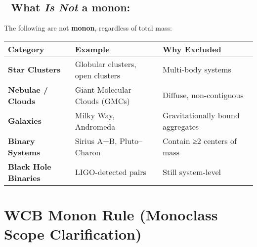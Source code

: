 \documentclass[
  letterpaper,
]{book}
\begin{document}
\subsection{\texorpdfstring{🚫 What \emph{Is Not} a
monon:}{🚫 What Is Not a monon:}}\label{what-is-not-a-monon}

The following are not \textbf{monon}, regardless of total mass:

\begin{longtable}[]{@{}
  >{\raggedright\arraybackslash}p{}
  >{\raggedright\arraybackslash}p{}
  >{\raggedright\arraybackslash}p{}@{}}
\toprule\noalign{}
\begin{minipage}[b]{\linewidth}\raggedright
Category
\end{minipage} & \begin{minipage}[b]{\linewidth}\raggedright
Example
\end{minipage} & \begin{minipage}[b]{\linewidth}\raggedright
Why Excluded
\end{minipage} \\
\midrule\noalign{}
\endhead
\bottomrule\noalign{}
\endlastfoot
\textbf{Star Clusters} & Globular clusters, open clusters & Multi-body
systems \\
\textbf{Nebulae / Clouds} & Giant Molecular Clouds (GMCs) & Diffuse,
non-contiguous \\
\textbf{Galaxies} & Milky Way, Andromeda & Gravitationally bound
aggregates \\
\textbf{Binary Systems} & Sirius A+B, Pluto--Charon & Contain ≥2 centers
of mass \\
\textbf{Black Hole Binaries} & LIGO-detected pairs & Still
system-level \\
\end{longtable}

\section{\texorpdfstring{\textbf{WCB Monon Rule (Monoclass Scope
Clarification)}}{WCB Monon Rule (Monoclass Scope Clarification)}}\label{wcb-monon-rule-monoclass-scope-clarification}
\end{document}
